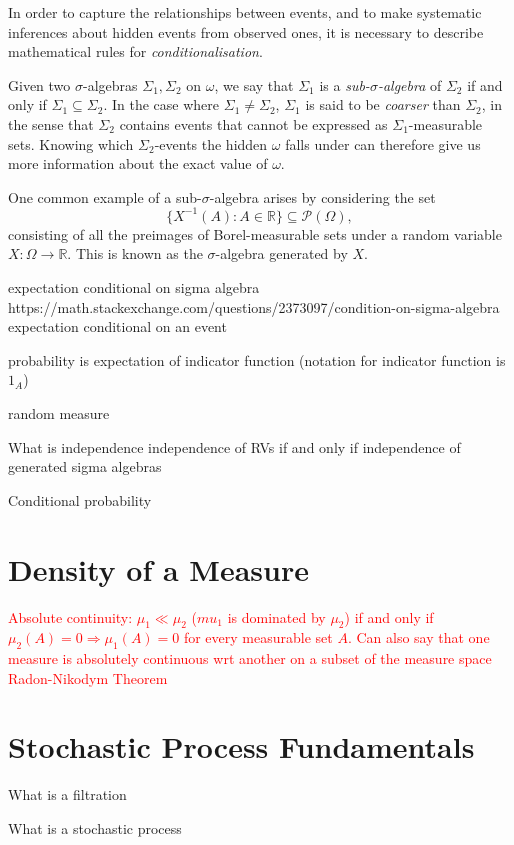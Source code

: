 \documentclass[honours,12pt]{unswthesis}
\def\implies{\Rightarrow}
\numberwithin{equation}{section}
\begin{document}
In order to capture the relationships between events, and to make systematic inferences about hidden events from observed ones, it is necessary to describe mathematical rules for \textit{conditionalisation}.

Given two $\sigma$-algebras $\Sigma_1,\Sigma_2$ on $\omega$, we say that $\Sigma_1$ is a \textit{sub-$\sigma$-algebra} of $\Sigma_2$ if and only if $\Sigma_1\subseteq\Sigma_2$. In the case where $\Sigma_1\not=\Sigma_2$, $\Sigma_1$ is said to be \textit{coarser} than $\Sigma_2$, in the sense that $\Sigma_2$ contains events that cannot be expressed as $\Sigma_1$-measurable sets. Knowing which $\Sigma_2$-events the hidden $\omega$ falls under can therefore give us more information about the exact value of $\omega$.

One common example of a sub-$\sigma$-algebra arises by considering the set
$$\{X^{-1}(A) : A\in\mathbb{R}\}\subseteq\mathcal{P}(\Omega),$$
consisting of all the preimages of Borel-measurable sets under a random variable $X:\Omega\to\mathbb{R}$. This is known as the $\sigma$-algebra generated by $X$.

expectation conditional on sigma algebra
https://math.stackexchange.com/questions/2373097/condition-on-sigma-algebra
expectation conditional on an event


probability is expectation of indicator function (notation for indicator function is $1_A$)

random measure

What is independence
independence of RVs if and only if independence of generated sigma algebras

Conditional probability

\section{Density of a Measure}
\textcolor{red}{Absolute continuity: $\mu_1\ll\mu_2$ ($mu_1$ is dominated by $\mu_2$) if and only if $\mu_2(A)=0\implies\mu_1(A)=0$ for every measurable set $A$. Can also say that one measure is absolutely continuous wrt another on a subset of the measure space}
\textcolor{red}{Radon-Nikodym Theorem}

\section{Stochastic Process Fundamentals}
What is a filtration

What is a stochastic process
\end{document}
